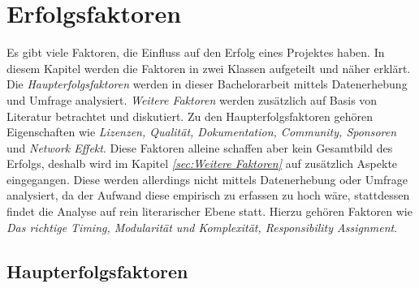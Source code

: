 \chapter{Erfolgsfaktoren}

Es gibt viele Faktoren, die Einfluss auf den Erfolg eines Projektes haben. 
In diesem Kapitel werden die Faktoren in zwei Klassen aufgeteilt und näher erklärt.
Die \textit{Haupterfolgsfaktoren} werden in dieser Bachelorarbeit mittels Datenerhebung und
Umfrage analysiert. 
\textit{Weitere Faktoren} werden zusätzlich auf Basis von Literatur betrachtet und diskutiert.
Zu den Haupterfolgsfaktoren gehören Eigenschaften wie \textit{Lizenzen, Qualität, Dokumentation, Community,
Sponsoren} und \textit{Network Effekt}. %
Diese Faktoren alleine schaffen aber kein Gesamtbild des Erfolgs, deshalb wird im Kapitel 
\textit{\ref{sec:Weitere Faktoren}} auf zusätzlich Aspekte eingegangen.
Diese werden allerdings nicht mittels Datenerhebung oder Umfrage analysiert, da der Aufwand
diese empirisch zu erfassen zu hoch wäre, stattdessen findet die Analyse auf rein literarischer Ebene statt. 
Hierzu gehören Faktoren wie \textit{Das richtige Timing, Modularität und Komplexität, Responsibility
Assignment}.%


\section{Haupterfolgsfaktoren} \label{sec:Haupterfolgsfaktoren}






